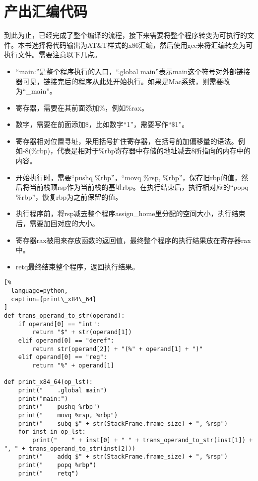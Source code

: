 \section{产出汇编代码}

到此为止，已经完成了整个编译的流程，接下来需要将整个程序转变为可执行的文件。本书选择将代码输出为AT\&T样式的x86汇编，然后使用gcc来将汇编转变为可执行文件。需要注意以下几点。

\begin{itemize}
  \item “main:”是整个程序执行的入口，“.global main”表示main这个符号对外部链接器可见，链接完后的程序从此处开始执行。如果是Mac系统，则需要改为“\_main”。
  \item 寄存器，需要在其前面添加\%，例如\%rax。
  \item 数字，需要在前面添加\$，比如数字“1”，需要写作“\$1”。
  \item 寄存器相对位置寻址，采用括号扩住寄存器，在括号前加偏移量的语法。例如-8(\%rbp)，代表是相对于\%rbp寄存器中存储的地址减去8所指向的内存中的内容。
  \item 开始执行时，需要“pushq \%rbp”，“movq \%rsp, \%rbp”，保存旧rbp的值，然后将当前栈顶rsp作为当前栈的基址rbp。在执行结束后，执行相对应的“popq \%rbp”，恢复rbp为之前保留的值。
  \item 执行程序前，将rsp减去整个程序assign\_home里分配的空间大小，执行结束后，需要加回对应的大小。
  \item 寄存器rax被用来存放函数的返回值，最终整个程序的执行结果放在寄存器rax中。
  \item retq最终结束整个程序，返回执行结果。
\end{itemize}


\begin{lstlisting}[%
  language=python,
  caption={print\_x84\_64}
]
def trans_operand_to_str(operand):
    if operand[0] == "int":
        return "$" + str(operand[1])
    elif operand[0] == "deref":
        return str(operand[2]) + "(%" + operand[1] + ")"
    elif operand[0] == "reg":
        return "%" + operand[1]

def print_x84_64(op_lst):
    print("    .global main")
    print("main:")
    print("    pushq %rbp")
    print("    movq %rsp, %rbp")
    print("    subq $" + str(StackFrame.frame_size) + ", %rsp")
    for inst in op_lst:
        print("    " + inst[0] + " " + trans_operand_to_str(inst[1]) + ", " + trans_operand_to_str(inst[2]))
    print("    addq $" + str(StackFrame.frame_size) + ", %rsp")
    print("    popq %rbp")
    print("    retq")
\end{lstlisting}



